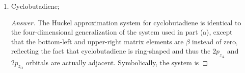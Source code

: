 \documentclass[../psets.tex]{subfiles}
\begin{document}
\begin{enumerate}
\begin{enumerate}
\begin{proof}[Answer]
\begin{align*}
\begin{pNiceArray}{ccc|c}
                    1 & \frac{\alpha-E_1}{\beta} & 1 & 0\\
                    0 & 1 & \frac{\alpha-E_1}{\beta} & 0\\
                \end{pNiceArray}\\
                &
                \begin{pNiceArray}{ccc|c}
                    -\sqrt{2} & 1 & 0 & 0\\
                    1 & -\sqrt{2} & 1 & 0\\
                    0 & 1 & -\sqrt{2} & 0\\
                \end{pNiceArray}\\
                &
                \begin{pNiceArray}{ccc|c}
                    1 & 0 & -1 & 0\\
                    0 & 1 & -\sqrt{2} & 0\\
                    0 & 0 & 0 & 0
                \end{pNiceArray}
            \end{align*}
            yields $\psi_1=(1c_3)2p_{z_\text{A}}+(\sqrt{2}c_3)2p_{z_\text{B}}+(c_3)2p_{z_\text{C}}$. We can pick a particular solution by normalizing to get $c_3=1/2$, yielding
            \begin{equation*}
                \boxed{\psi_1 = \frac{1}{2}2p_{z_\text{A}}+\frac{1}{\sqrt{2}}2p_{z_\text{B}}+\frac{1}{2}2p_{z_\text{C}}}
            \end{equation*}
            Repeating the process for $E_2$ and $E_3$ gives
            \begin{align*}
                \Aboxed{\psi_2 &= -\frac{1}{\sqrt{2}}2p_{z_\text{A}}+\frac{1}{\sqrt{2}}2p_{z_\text{C}}}\\
                \Aboxed{\psi_3 &= \frac{1}{2}2p_{z_\text{A}}-\frac{1}{\sqrt{2}}2p_{z_\text{B}}+\frac{1}{2}2p_{z_\text{C}}}
            \end{align*}
        \end{proof}
        \item Cyclobutadiene;
        \begin{proof}[Answer]
            The Huckel approximation system for cyclobutadiene is identical to the four-dimensional generalization of the system used in part (a), except that the bottom-left and upper-right matrix elements are $\beta$ instead of zero, reflecting the fact that cyclobutadiene is ring-shaped and thus the $2p_{z_\text{A}}$ and $2p_{z_\text{D}}$ orbitals are actually adjacent. Symbolically, the system is

\end{proof}
\end{enumerate}
\end{enumerate}
\end{document}
